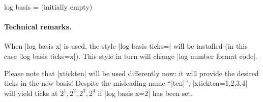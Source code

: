\begin{pgfplotsxykey}{log basis \x= (initially empty)}
	\paragraph{Technical remarks.} When |log basis x| is used, the style |log basis ticks=| will be installed (in this case |log basis ticks=x|). This style in turn will change |log number format code|.

	Please note that |xtickten| will be used differently now: it will provide the desired ticks in the new basis! Despite the misleading name ``|ten|'', |xtickten={1,2,3,4}| will yield ticks at $2^1,2^2,2^3,2^4$ if |log basis x=2| has been set.
\end{pgfplotsxykey}
